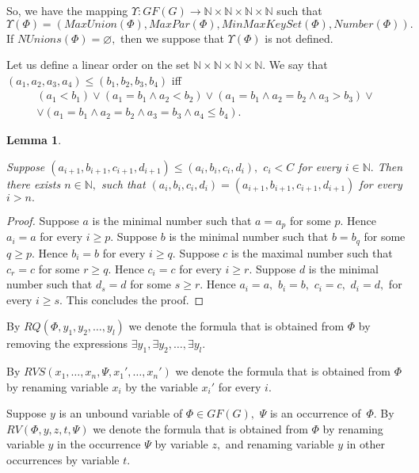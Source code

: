 \documentclass{au}
\theoremstyle{plain}
\newtheorem{lemma}{Lemma}
\theoremstyle{definition}
\theoremstyle{remark}
\numberwithin{equation}{section}
\begin{document}
So, we have the mapping $\Upsilon: GF(G) \longrightarrow \mathbb N \times \mathbb N \times \mathbb N \times \mathbb N$
such that
$$\Upsilon(\Phi) = (MaxUnion(\Phi),MaxPar(\Phi),MinMaxKeySet(\Phi),Number(\Phi)).$$
If $NUnions(\Phi) = \varnothing,$ then we suppose that $\Upsilon(\Phi)$ is not defined.

Let us define a linear order on the set $\mathbb N \times \mathbb N \times \mathbb N \times \mathbb N.$
We say that $(a_{1},a_{2},a_{3},a_{4})\le (b_{1},b_{2},b_{3},b_{4})$ iff
\begin{multline*}(a_{1}<b_{1}) \vee (a_{1} = b_{1} \wedge a_{2}<b_{2}) \vee  (a_{1} = b_{1} \wedge a_{2}=b_{2}
\wedge a_{3}> b_{3}) \vee \\
\vee  (a_{1} = b_{1} \wedge a_{2}=b_{2}   \wedge a_{3}=b_{3}
\wedge a_{4}\le b_{4}).\end{multline*}

\begin{lemma}\label{posledovatelnostKonechna}

Suppose
$(a_{i+1},b_{i+1},c_{i+1},d_{i+1})\le
(a_{i},b_{i},c_{i},d_{i}),$
$c_{i}<C$
for every $i\in \mathbb N.$
Then there exists $n\in \mathbb N,$
such that
$(a_{i},b_{i},c_{i},d_{i}) = (a_{i+1},b_{i+1},c_{i+1},d_{i+1})$
for every $i>n.$

\end{lemma}

\begin{proof}

Suppose $a$ is the minimal number such that
$a=a_{p}$ for some $p.$
Hence $a_{i} = a$ for every $i\ge p.$
Suppose $b$ is the minimal number such that
$b=b_{q}$ for some $q\ge p.$
Hence $b_{i} = b$ for every $i\ge q.$
Suppose $c$ is the maximal number such that
$c_{r} = c$ for some $r\ge q.$
Hence $c_{i} = c$ for every $i\ge r.$
Suppose $d$ is the minimal number such that
$d_{s} = d$ for some $s\ge r.$
Hence $a_{i} = a,$
$b_{i} = b,$
$c_{i} = c,$
$d_{i} = d,$
for every $i\ge s.$
This concludes the proof.

\end{proof}

By $RQ(\Phi,y_{1},y_{2},\ldots,y_{l})$ we denote the formula that is obtained from $\Phi$
by removing the expressions $\exists y_{1},\exists y_{2},\ldots,\exists y_{l}.$ 

By $RVS(x_{1},\ldots,x_{n},\Psi, x_{1}',\ldots,x_{n}')$
we denote
the formula that is obtained from $\Phi$
by renaming variable $x_{i}$ by the variable $x_{i}'$
for every $i.$

Suppose $y$ is an unbound variable of $\Phi\in GF(G),$ $\Psi$ is an occurrence of~$\Phi.$
By $RV(\Phi, y, z, t,  \Psi)$ we denote the formula that is obtained from $\Phi$
by renaming variable $y$ in the occurrence $\Psi$ 
by variable $z,$
and renaming variable $y$ in other occurrences
by variable $t.$
\end{document}
